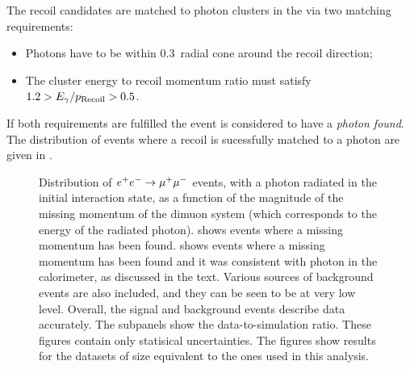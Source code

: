 The recoil candidates are matched to photon clusters in the \ECL via two matching requirements:
\begin{itemize}
    \item Photons have to be within 0.3~\rad radial cone around the recoil direction;
    \item The cluster energy to recoil momentum ratio must satisfy $1.2>E_{\gamma}/{p_{\mathrm{Recoil}}}>0.5$.
\end{itemize}
If both requirements are fulfilled the event is considered to have a \textit{photon found}.
The distribution of events where a recoil is sucessfully matched to a photon are given in .
\begin{figure}[htbp!]
    \centering
    \caption{\label{fig:normalisation_data_mc} Distribution of $e^+e^-\rightarrow\mu^+\mu^-$ events, with a photon radiated in the initial interaction state, as a function of the magnitude of the missing momentum of the dimuon system (which corresponds to the energy of the radiated photon).
     shows events where a missing momentum has been found.
     shows events where a missing momentum has been found and it was consistent with photon in the calorimeter, as discussed in the text.
    Various sources of background events are also included, and they can be seen to be at very low level.
    Overall, the signal and background events describe data accurately.
    The subpanels show the data-to-simulation ratio.
    These figures contain only statisical uncertainties.
    The figures show results for the datasets of size equivalent to the ones used in this analysis.
    }
\end{figure}

